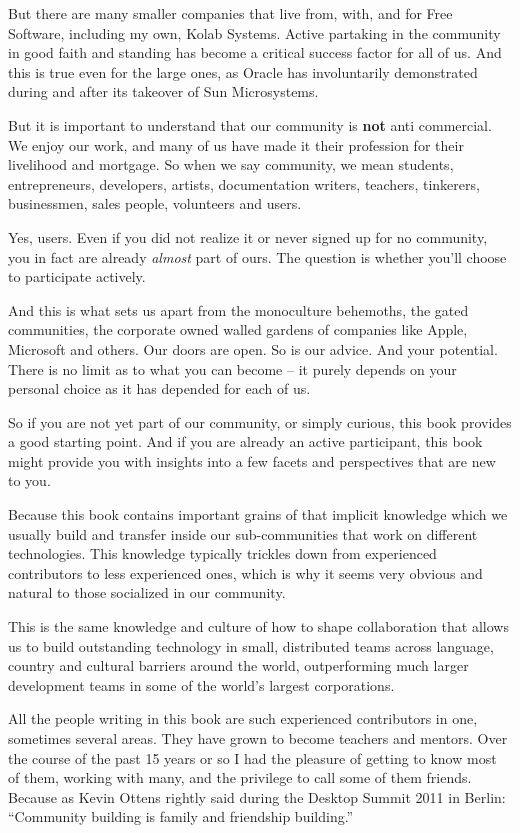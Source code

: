 But there are many smaller companies that live from, with, and for
Free Software, including my own, Kolab Systems. Active partaking in
the community in good faith and standing has become a critical success
factor for all of us. And this is true even for the large ones, as
Oracle has involuntarily demonstrated during and after its takeover of
Sun Microsystems.

But it is important to understand that our community is \textbf{not}
anti commercial. We enjoy our work, and many of us have made it their
profession for their livelihood and mortgage. So when we say
community, we mean students, entrepreneurs, developers, artists,
documentation writers, teachers, tinkerers, businessmen, sales people,
volunteers and users.

Yes, users. Even if you did not realize it or never signed up for no
community, you in fact are already \emph{almost} part of ours. The
question is whether you'll choose to participate actively.

And this is what sets us apart from the monoculture behemoths, the
gated communities, the corporate owned walled gardens of companies
like Apple, Microsoft and others. Our doors are open. So is our
advice. And your potential. There is no limit as to what you can
become -- it purely depends on your personal choice as it has
depended for each of us.

So if you are not yet part of our community, or simply curious, this
book provides a good starting point. And if you are already an active
participant, this book might provide you with insights into a few
facets and perspectives that are new to you.

Because this book contains important grains of that implicit
knowledge which we usually build and transfer inside our
sub-communities that work on different technologies. This knowledge
typically trickles down from experienced contributors to less
experienced ones, which is why it seems very obvious and
natural to those socialized in our community.

This is the same knowledge and culture of how to shape collaboration
that allows us to build outstanding technology in small, distributed
teams across language, country and cultural barriers around the world,
outperforming much larger development teams in some of the world's
largest corporations.

All the people writing in this book are such experienced contributors
in one, sometimes several areas. They have grown to become teachers
and mentors. Over the course of the past 15 years or so I had the
pleasure of getting to know most of them, working with many, and the
privilege to call some of them friends. Because as Kevin Ottens
rightly said during the Desktop Summit 2011 in Berlin: ``Community
building is family and friendship building.''

